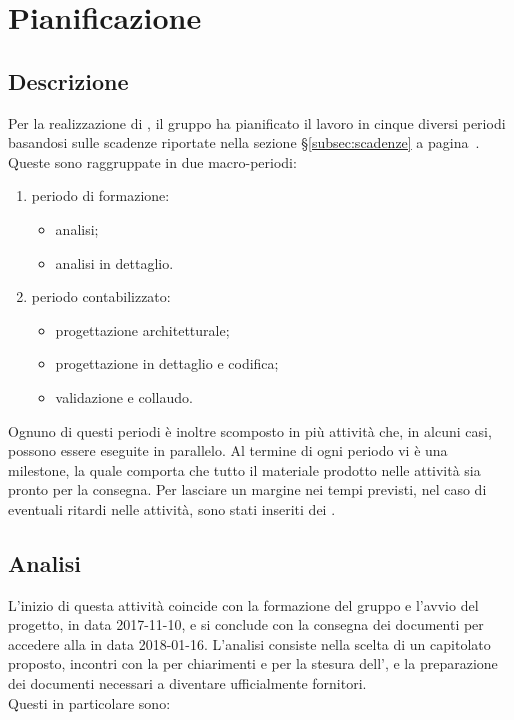 \section{Pianificazione}
	\label{pianificazione}
	\subsection{Descrizione}

		Per la realizzazione di \ProjectName{}, il gruppo \GroupName{} 
		ha pianificato il lavoro in cinque diversi periodi basandosi sulle 
		scadenze riportate nella sezione §\ref{subsec:scadenze} a pagina~\pageref{subsec:scadenze}. Queste sono raggruppate
		in due macro-periodi:

		\begin{enumerate}
			\item periodo di formazione:
                \begin{itemize}
                    \item analisi;
                    \item analisi in dettaglio.
                \end{itemize}
			\item periodo contabilizzato:
                \begin{itemize}
                    \item progettazione architetturale;
                    \item progettazione in dettaglio e codifica;
                    \item validazione e collaudo.
                \end{itemize}
		\end{enumerate}
		
		Ognuno di questi periodi è inoltre scomposto in più attività che, in 
		alcuni casi, possono essere eseguite in parallelo. Al 
		termine di ogni periodo vi è una milestone, la quale 
		comporta che tutto il materiale prodotto nelle attività sia 
		pronto per la consegna. 
		Per lasciare un margine nei tempi previsti, nel caso di eventuali 
		ritardi nelle attività, sono stati inseriti dei 
		.

	\subsection{Analisi}
	\label{pianificazioneAnalisi}
        L'inizio di questa attività coincide con la formazione del gruppo e
        l'avvio del progetto, in data 2017-11-10, e si conclude con la
        consegna dei documenti per accedere alla \RR{} in data
        2018-01-16. L'analisi consiste nella scelta di un capitolato proposto,
        incontri con la  per chiarimenti e per la stesura 
        dell'\AnalisiRequisiti{}, e la preparazione dei documenti necessari
        a diventare ufficialmente fornitori. \\
        Questi in particolare sono:

